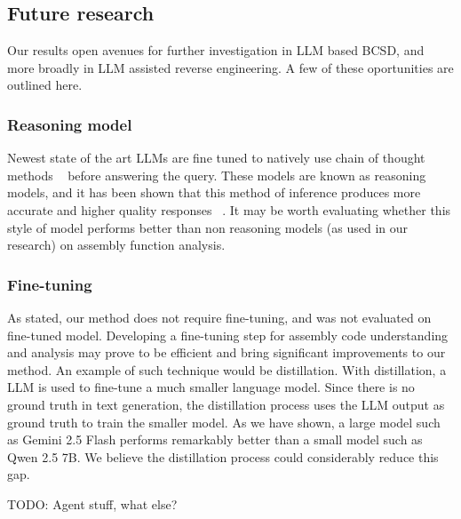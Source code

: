 \documentclass[conference,compsoc]{IEEEtran}
\begin{document}
\subsection{Future research}

Our results open avenues for further investigation in LLM based BCSD, and more broadly in LLM assisted reverse engineering.
A few of these oportunities are outlined here.

\subsubsection{Reasoning model}

Newest state of the art LLMs are fine tuned to natively use chain of thought methods ~\cite{c-o-t} before answering the query.
These models are known as reasoning models, and it has been shown that this method of inference produces more accurate and
higher quality responses ~\cite{c-o-t,reasoning,thinking-llm}. It may be worth evaluating whether this style of model performs better than
non reasoning models (as used in our research) on assembly function analysis.

\subsubsection{Fine-tuning}

As stated, our method does not require fine-tuning, and was not evaluated on fine-tuned model. Developing a fine-tuning step
for assembly code understanding and analysis may prove to be efficient and bring significant improvements to our method.
An example of such technique would be distillation. With distillation, a LLM is used to fine-tune a much smaller language
model. Since there is no ground truth in text generation, the distillation process uses the LLM output as ground truth
to train the smaller model. As we have shown, a large model such as Gemini 2.5 Flash performs remarkably better than a
small model such as Qwen 2.5 7B. We believe the distillation process could considerably reduce this gap.

TODO: Agent stuff, what else?

\nocite{*}


\end{document}
